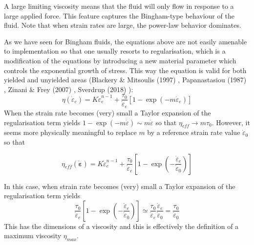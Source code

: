 A large limiting viscosity means that the fluid will only flow in response to a large applied force. 
This feature captures the Bingham-type behaviour of the fluid. 
Note that when strain rates are large, the power-law behavior dominates. 

As we have seen for Bingham fluids, the equations above are not easily amenable to implementation so that 
one usually resorts to regularisation, which is a modification of the 
equations by introducing a new material parameter which controls the exponential 
growth of stress. This way the equation is valid for both yielded 
and unyielded areas (Blackery \& Mitsoulis (1997) \cite{blmi97},
Papanastasiou (1987) \cite{papa87}, Zinani \& Frey (2007) \cite{zifr07}, 
Sverdrup \etal (2018) \cite{svna18}):
\begin{equation}
\eta(\dot{\varepsilon}_e) 
= K \dot{\varepsilon}_e^{n-1} + \frac{\tau_0}{\dot{\varepsilon}_e} [1 - \exp(-m \dot{\varepsilon}_e)] 
\end{equation}
When the strain rate becomes (very) small a Taylor expansion of the regularisation 
term yields $1- \exp(-m \dot{\varepsilon}) \sim m \dot{\varepsilon} $ so that 
$\eta_{eff} \rightarrow m \tau_0$.
However, it seems more physically meaningful to replace $m$ by a reference strain 
rate value $\dot{\varepsilon}_0$ so that 
\begin{mdframed}[backgroundcolor=blue!5]
\begin{equation}
\eta_{eff}(\dot{\bm \varepsilon}) 
= K \dot{\varepsilon}_e^{n-1} + \frac{\tau_0}{\dot{\varepsilon}_e} 
\left[1 - \exp\left(-\frac{\dot{\varepsilon}_e}{\dot{\varepsilon}_0} \right) \right]
\end{equation}
\end{mdframed}
In this case, when strain rate becomes (very) small a Taylor expansion of the regularisation
term yields
\begin{equation}
\frac{\tau_0}{\dot{\varepsilon}_e} \left[1 - 
\exp\left(-\frac{\dot{\varepsilon}_e}{\dot{\varepsilon}_0} \right) \right]
\simeq 
\frac{\tau_0}{\dot{\varepsilon}_e} \frac{\dot{\varepsilon}_e}{\dot{\varepsilon}_0}
=\frac{\tau_0}{\dot{\varepsilon}_0} 
\end{equation}
This has the dimensions of a viscosity and this is effectively the definition 
of a maximum viscosity $\eta_{max}$.


